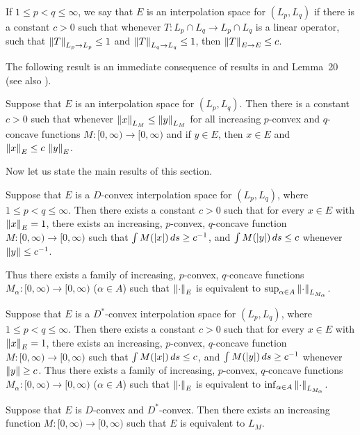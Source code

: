 If $1 \le p < q \le \infty$, we say that $E$ is an interpolation space for
$(L_p,L_q)$ if there is a constant $c>0$ such that
whenever $T:L_p\cap L_q \to L_p \cap L_q$ is a linear
operator, such that $\left\|T\right\|_{L_p \to L_p} \le 1$ and
$\left\|T\right\|_{L_q \to L_q} \le 1$, then $\left\|T\right\|_{E\to E} \le c$.

The following result is an immediate consequence of results in \cite{HM} and
Lemma~20 (see also \cite{AC}).

Suppose that $E$ is an interpolation space for $(L_p,L_q)$.  Then
there is a constant $c>0$ such that
whenever $\left\|x\right\|_{L_M} \le \left\|y\right\|_{L_M}$ for all
increasing
$p$-convex and
$q$-concave functions $M:[0,\infty) \to [0,\infty)$
and if $y \in E$, then $x \in E$ and $\left\|x\right\|_E \le c\, \left\|y\right\|_E$.
\endproclaim

Now let us state the main results of this section.

Suppose that $E$ is a $D$-convex interpolation
space for $(L_p,L_q)$, where $1 \le p < q \le \infty$.
Then there exists a constant $c>0$
such that for every $x \in E$ with $\left\|x\right\|_E = 1$, there exists
an increasing, $p$-convex, $q$-concave function $M:[0,\infty)
\to [0,\infty)$ such that $\int M(\left|x\right|) \, ds \ge c^{-1}$, and
$\int M(\left|y\right|) \, ds \le c$ whenever $\left\|y\right\| \le c^{-1}$.

Thus there exists a family of increasing, $p$-convex, $q$-concave
functions $M_\alpha:[0,\infty) \to [0,\infty)$ ($\alpha\in A$)
such that $\left\|\cdot\right\|_E$ is equivalent to
$\sup_{\alpha\in A} \left\|\cdot\right\|_{L_{M_\alpha}}$.
\endproclaim

Suppose that $E$ is a $D^*$-convex interpolation
space for $(L_p,L_q)$, where $1 \le p < q \le \infty$.
Then there exists a constant $c>0$
such that for every $x \in E$ with $\left\|x\right\|_E = 1$, there exists
an increasing, $p$-convex, $q$-concave function $M:[0,\infty)
\to [0,\infty)$ such that $\int M(\left|x\right|) \, ds \le c$, and
$\int M(\left|y\right|) \, ds \ge c^{-1}$ whenever $\left\|y\right\| \ge c$.
\moreproclaim
Thus there exists a family of increasing, $p$-convex, $q$-concave
functions $M_\alpha:[0,\infty) \to [0,\infty)$ ($\alpha\in A$)
such that $\left\|\cdot\right\|_E$ is equivalent to
$\inf_{\alpha\in A} \left\|\cdot\right\|_{L_{M_\alpha}}$.
\endproclaim

  Suppose that $E$ is $D$-convex
and $D^*$-convex.  Then there exists an increasing function
$M:[0,\infty)
\to [0,\infty)$ such that $E$ is equivalent to $L_M$.
\endproclaim

